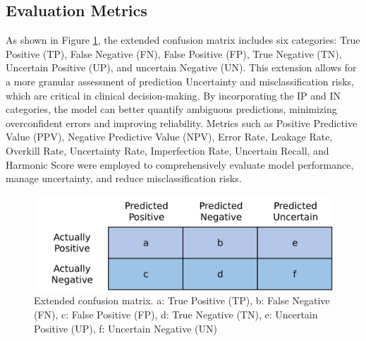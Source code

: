 \documentclass{ieeeaccess}
\begin{document}
\subsection{Evaluation Metrics}
As shown in Figure \ref{fig:enter-ECM}, the extended confusion matrix includes six categories: True Positive (TP), False Negative (FN), False Positive (FP), True Negative (TN), Uncertain Positive (UP), and uncertain Negative (UN). This extension allows for a more granular assessment of prediction Uncertainty and misclassification risks, which are critical in clinical decision-making. By incorporating the IP and IN categories, the model can better quantify ambiguous predictions, minimizing overconfident errors and improving reliability. Metrics such as Positive Predictive Value (PPV), Negative Predictive Value (NPV), Error Rate, Leakage Rate, Overkill Rate, Uncertainty Rate, Imperfection Rate, Uncertain Recall, and Harmonic Score were employed to comprehensively evaluate model performance, manage uncertainty, and reduce misclassification risks.

\begin{figure}[H]
    \centering
    \includegraphics[width=1\linewidth]{new Extended confusion matrix.pdf}
    \caption{Extended confusion matrix. a: True Positive (TP), b: False Negative (FN), c: False Positive (FP), d: True Negative (TN), e: Uncertain Positive (UP), f: Uncertain Negative (UN)}
    \label{fig:enter-ECM}
\end{figure}
\end{document}
